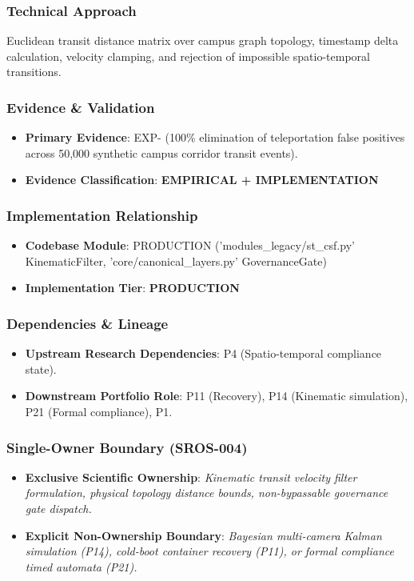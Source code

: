 \documentclass[11pt,letterpaper]{article}
\begin{document}
\subsubsection{Technical Approach}
Euclidean transit distance matrix over campus graph topology, timestamp delta calculation, velocity clamping, and rejection of impossible spatio-\allowbreak temporal transitions.

\subsubsection{Evidence \& Validation}
\begin{itemize}[leftmargin=*]
    \item \textbf{Primary Evidence}: EXP- (100\% elimination of teleportation false positives across 50,000 synthetic campus corridor transit events).
    \item \textbf{Evidence Classification}: \textbf{EMPIRICAL + IMPLEMENTATION}
\end{itemize}

\subsubsection{Implementation Relationship}
\begin{itemize}[leftmargin=*]
    \item \raggedright \textbf{Codebase Module}: PRODUCTION ('modules\_\allowbreak legacy/\allowbreak st\_\allowbreak csf.py' KinematicFilter, 'core/\allowbreak canonical\_\allowbreak layers.py' GovernanceGate)
    \item \textbf{Implementation Tier}: \textbf{PRODUCTION}
\end{itemize}

\subsubsection{Dependencies \& Lineage}
\begin{itemize}[leftmargin=*]
    \item \textbf{Upstream Research Dependencies}: P4 (Spatio-\allowbreak temporal compliance state).
    \item \textbf{Downstream Portfolio Role}: P11 (Recovery), P14 (Kinematic simulation), P21 (Formal compliance), P1.
\end{itemize}

\subsubsection{Single-Owner Boundary (SROS-004)}
\begin{itemize}[leftmargin=*]
    \item \textbf{Exclusive Scientific Ownership}: \textit{Kinematic transit velocity filter formulation, physical topology distance bounds, non-\allowbreak bypassable governance gate dispatch.}
    \item \textbf{Explicit Non-Ownership Boundary}: \textit{Bayesian multi-\allowbreak camera Kalman simulation (P14), cold-\allowbreak boot container recovery (P11), or formal compliance timed automata (P21).}
\end{itemize}
\end{document}
